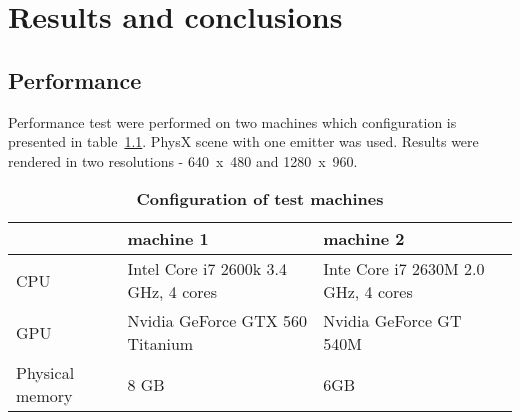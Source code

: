 

\chapter{Results and conclusions}

\graphicspath{{results/figures/}}


\section{Performance}


Performance test were performed on two machines which configuration is presented in table~\ref{tab:test_configuration}. PhysX scene with one emitter was used. Results were rendered in two resolutions - 640~x~480 and 1280~x~960. 





\begin{table}   
    \caption[Configuration of test machines]{\textbf{Configuration of test machines}}
    \centering
    \begin{tabular}{ l | p{4.5cm} | p{4.5cm} }
                                         & machine 1                                             & machine 2 \\ \hline
        CPU                           & Intel Core i7 2600k 3.4 GHz, 4 cores  & Inte Core i7 2630M 2.0 GHz, 4 cores \\ \hline
        GPU                           & Nvidia GeForce GTX 560 Titanium        &  Nvidia GeForce GT 540M \\ \hline
        Physical memory       & 8 GB                                                      & 6GB \\
    \end{tabular}
    \label{tab:test_configuration}
\end{table}

